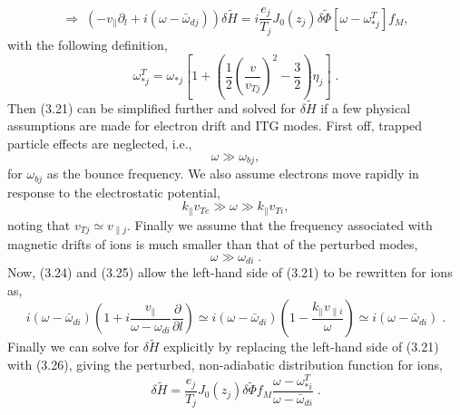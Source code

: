 \documentclass[12pt]{article}
\numberwithin{equation}{section}
\begin{document}
   \begin{equation}
      \Rightarrow\; (-v_\parallel\partial_l + i(\omega - \bar{\omega}_{dj}))\delta\widetilde{H}
      = i\frac{e_j}{T_j}J_0(z_j)\delta\widetilde{\Phi}[\omega - \omega_{*j}^T]f_M,
   \end{equation}
with the following definition,
   \begin{equation}
      \omega_{*j}^T = \omega_{*j}[1 + (\frac{1}{2}\left(\frac{v}{v_{Tj}}\right)^2-\frac{3}{2})\eta_j]\;.
   \end{equation}
Then (3.21) can be simplified further and solved for $\delta\widetilde{H}$ if a few physical assumptions are made for electron drift and ITG modes.
First off, trapped particle effects are neglected, i.e.,
   \begin{equation}
      \omega \gg \omega_{bj},
   \end{equation}
for $\omega_{bj}$ as the bounce frequency. We also assume electrons move rapidly in response to the electrostatic potential,
   \begin{equation}
      k_\parallel v_{Te} \gg \omega \gg k_\parallel v_{Ti},
   \end{equation}
noting that $v_{Tj} \simeq v_{\parallel j}$. Finally we assume that the frequency associated with magnetic drifts of ions is much smaller than
that of the perturbed modes,
   \begin{equation}
      \omega \gg \omega_{di}\;.
   \end{equation}
Now, (3.24) and (3.25) allow the left-hand side of (3.21) to be rewritten for ions as,
   \begin{equation}
      i(\omega-\bar{\omega}_{di})(1+i\frac{v_\parallel}{\omega-\omega_{di}}\frac{\partial}{\partial l}) \simeq
      i(\omega-\bar{\omega}_{di})(1-\frac{k_\parallel v_{\parallel i}}{\omega}) \simeq i(\omega-\bar{\omega}_{di})\;.
   \end{equation}
Finally we can solve for $\delta\widetilde{H}$ explicitly by replacing the left-hand side of (3.21) with (3.26), giving
the perturbed, non-adiabatic distribution function for ions,
   \begin{equation}
      \delta\widetilde{H} = \frac{e_j}{T_j}J_0(z_j)\delta\widetilde{\Phi}f_M\frac{\omega-\omega_{*i}^T}{\omega-\bar{\omega}_{di}}\;.
   \end{equation}
\end{document}
